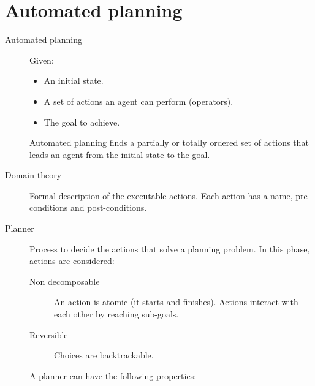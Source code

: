\chapter{Automated planning}

\begin{description}
    \item[Automated planning]  
        Given:
        \begin{itemize}
            \item An initial state.
            \item A set of actions an agent can perform (operators).
            \item The goal to achieve.
        \end{itemize}
        Automated planning finds a partially or totally ordered set of actions
        that leads an agent from the initial state to the goal.

    \item[Domain theory] 
        Formal description of the executable actions.
        Each action has a name, pre-conditions and post-conditions.

    \item[Planner] 
        Process to decide the actions that solve a planning problem.
        In this phase, actions are considered:
        \begin{description}
            \item[Non decomposable] 
                An action is atomic (it starts and finishes).
                Actions interact with each other by reaching sub-goals.
            \item[Reversible] 
                Choices are backtrackable.
        \end{description}

        A planner can have the following properties:


\end{description}
